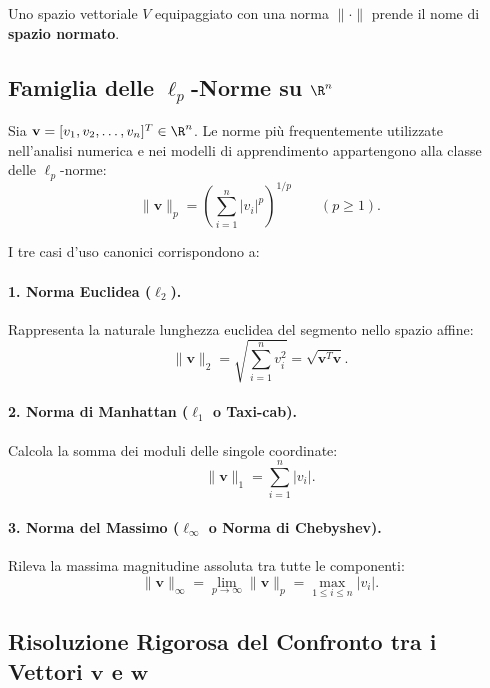Uno spazio vettoriale $V$ equipaggiato con una norma $\|\cdot\|$ prende il nome di \textbf{spazio normato}.

\subsection{Famiglia delle \texorpdfstring{$\ell_p$}{lp}-Norme su \texorpdfstring{$\R^n$}{Rn}}

Sia $\mathbf{v} = [v_1, v_2, \dots, v_n]^T \in \R^n$. Le norme più frequentemente utilizzate nell'analisi numerica e nei modelli di apprendimento appartengono alla classe delle $\ell_p$-norme:
\begin{equation}
    \|\mathbf{v}\|_p = \left( \sum_{i=1}^n |v_i|^p \right)^{1/p} \qquad (p \ge 1).
\end{equation}

I tre casi d'uso canonici corrispondono a:

\paragraph{1. Norma Euclidea ($\ell_2$).}
Rappresenta la naturale lunghezza euclidea del segmento nello spazio affine:
\begin{equation}
    \|\mathbf{v}\|_2 = \sqrt{\sum_{i=1}^n v_i^2} = \sqrt{\mathbf{v}^T \mathbf{v}}.
\end{equation}

\paragraph{2. Norma di Manhattan ($\ell_1$ o Taxi-cab).}
Calcola la somma dei moduli delle singole coordinate:
\begin{equation}
    \|\mathbf{v}\|_1 = \sum_{i=1}^n |v_i|.
\end{equation}

\paragraph{3. Norma del Massimo ($\ell_\infty$ o Norma di Chebyshev).}
Rileva la massima magnitudine assoluta tra tutte le componenti:
\begin{equation}
    \|\mathbf{v}\|_\infty = \lim_{p \to \infty} \|\mathbf{v}\|_p = \max_{1 \le i \le n} |v_i|.
\end{equation}

\subsection{Risoluzione Rigorosa del Confronto tra i Vettori \texorpdfstring{$\mathbf{v}$}{v} e \texorpdfstring{$\mathbf{w}$}{w}}

